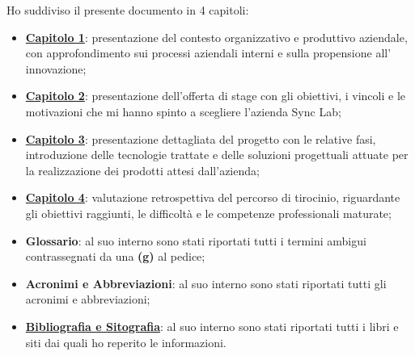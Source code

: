 \noindent Ho suddiviso il presente documento in 4 capitoli:
\begin{itemize}
  \item \hyperref[cap:contesto-aziendale]{\textbf{Capitolo 1}}: presentazione del contesto organizzativo e produttivo aziendale, con approfondimento sui processi aziendali interni e sulla propensione all' innovazione;

  \item \hyperref[cap:stage]{\textbf{Capitolo 2}}: presentazione dell'offerta di stage con gli obiettivi, i vincoli e le motivazioni che mi hanno spinto a scegliere l'azienda Sync Lab; 
  
  \item \hyperref[cap:nftlab]{\textbf{Capitolo 3}}: presentazione dettagliata del progetto con le relative fasi, introduzione delle tecnologie trattate e delle soluzioni progettuali attuate per la realizzazione dei prodotti attesi dall'azienda;
  
  \item \hyperref[cap:valutazione-finale]{\textbf{Capitolo 4}}: valutazione retrospettiva del percorso di tirocinio, riguardante gli obiettivi raggiunti, le difficoltà e le competenze professionali maturate;
  
  \item \textbf{Glossario}: al suo interno sono stati riportati tutti i termini ambigui contrassegnati da una \textbf{(g)} al pedice;
  
  \item \textbf{Acronimi e Abbreviazioni}: al suo interno sono stati riportati tutti gli acronimi e abbreviazioni;
  
  \item \hyperref[cap:bibliografia-sitografia]{\textbf{Bibliografia e Sitografia}}: al suo interno sono stati riportati tutti i libri e siti dai quali ho reperito le informazioni.
\end{itemize}

%
%

\endgroup

\vfill

